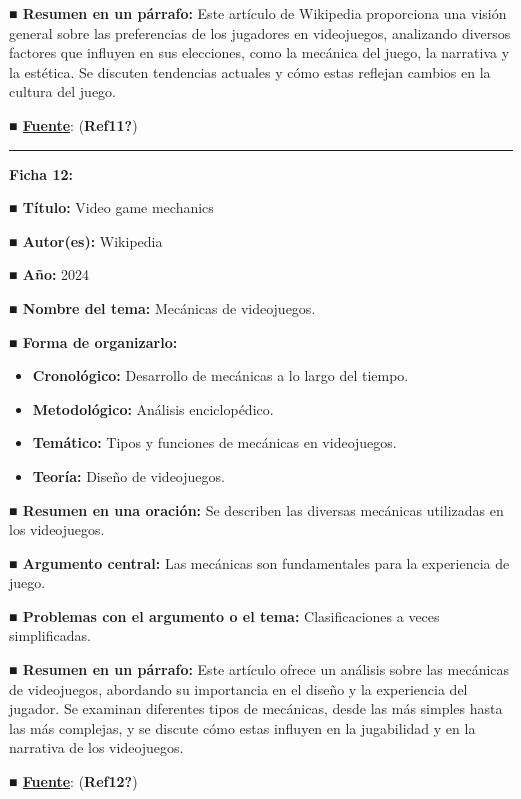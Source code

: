 \documentclass[
  letterpaper,
  DIV=11,
  numbers=noendperiod]{scrreprt}
\begin{document}
\textbf{■ Resumen en un párrafo:} Este artículo de Wikipedia proporciona
una visión general sobre las preferencias de los jugadores en
videojuegos, analizando diversos factores que influyen en sus
elecciones, como la mecánica del juego, la narrativa y la estética. Se
discuten tendencias actuales y cómo estas reflejan cambios en la cultura
del juego.

\textbf{■
\href{https://en.wikipedia.org/wiki/Video_game_preferences}{Fuente}}:
(\textbf{Ref11?})

\begin{center}\rule{0.5\linewidth}{0.5pt}\end{center}

\textbf{Ficha 12:}

\textbf{■ Título:} Video game mechanics

\textbf{■ Autor(es):} Wikipedia

\textbf{■ Año:} 2024

\textbf{■ Nombre del tema:} Mecánicas de videojuegos.

\textbf{■ Forma de organizarlo:}

\begin{itemize}
\item
  \textbf{Cronológico:} Desarrollo de mecánicas a lo largo del tiempo.
\item
  \textbf{Metodológico:} Análisis enciclopédico.
\item
  \textbf{Temático:} Tipos y funciones de mecánicas en videojuegos.
\item
  \textbf{Teoría:} Diseño de videojuegos.
\end{itemize}

\textbf{■ Resumen en una oración:} Se describen las diversas mecánicas
utilizadas en los videojuegos.

\textbf{■ Argumento central:} Las mecánicas son fundamentales para la
experiencia de juego.

\textbf{■ Problemas con el argumento o el tema:} Clasificaciones a veces
simplificadas.

\textbf{■ Resumen en un párrafo:} Este artículo ofrece un análisis sobre
las mecánicas de videojuegos, abordando su importancia en el diseño y la
experiencia del jugador. Se examinan diferentes tipos de mecánicas,
desde las más simples hasta las más complejas, y se discute cómo estas
influyen en la jugabilidad y en la narrativa de los videojuegos.

\textbf{■
\href{https://en.wikipedia.org/wiki/Video_game_mechanics}{Fuente}}:
(\textbf{Ref12?})
\end{document}
